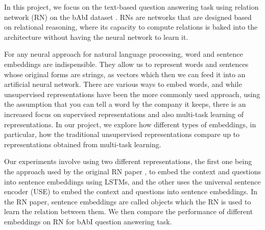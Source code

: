 \documentclass{article}
\begin{document}

In this project, we focus on the text-based question answering task using relation network (RN) \cite{Santoro2017} on the bAbI dataset \cite{Weston2015}. RNs are networks that are designed based on relational reasoning, where its capacity to compute relations is baked into the architecture without having the neural network to learn it. 

For any neural approach for natural language processing, word and sentence embeddings are indispensible. They allow us to represent words and sentences whose original forms are strings, as vectors which then we can feed it into an artificial neural network. There are various ways to embed words, and while unsupervised representations have been the more commonly used approach, using the assumption that you can tell a word by the company it keeps, there is an increased focus on supervised representations and also multi-task learning of representations. In our project, we explore how different types of embeddings, in particular, how the traditional unsupervised representations compare up to representations obtained from multi-task learning.





Our experiments involve using two different representations, the first one being the approach used by the original RN paper \cite{Santoro2017}, to embed the context and questions into sentence embeddings using LSTMs, and the other uses the universal sentence encoder (USE) \cite{Cer2018} to embed the context and questions into sentence embeddings. In the RN paper, sentence embeddings are called objects which the RN is used to learn the relation between them. We then compare the performance of different embeddings on RN for bAbI question answering task.


\end{document}
